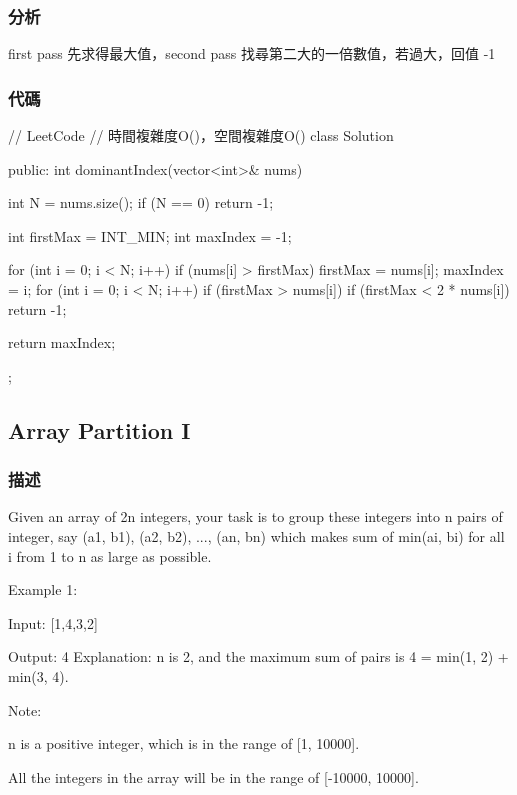 \subsubsection{分析}
first pass 先求得最大值，second pass 找尋第二大的一倍數值，若過大，回值 -1

\subsubsection{代碼}
\begin{Code}
// LeetCode
// 時間複雜度O()，空間複雜度O()
class Solution {
public:
    int dominantIndex(vector<int>& nums) {
        int N = nums.size();
        if (N == 0) return -1;

        int firstMax = INT_MIN;
        int maxIndex = -1;

        for (int i = 0; i < N; i++) {
            if (nums[i] > firstMax) {
                firstMax = nums[i];
                maxIndex = i;
            }
        }
        for (int i = 0; i < N; i++) {
            if (firstMax > nums[i])
                if (firstMax < 2 * nums[i]) return -1;
        }

        return maxIndex;
    }
};
\end{Code}

\subsection{Array Partition I}
\label{sec:array-partition-i}

\subsubsection{描述}
Given an array of 2n integers, your task is to group these integers into n pairs of integer, say (a1, b1), (a2, b2), ..., (an, bn) which makes sum of min(ai, bi) for all i from 1 to n as large as possible.

Example 1:
\begin{Code}
Input: [1,4,3,2]

Output: 4
Explanation: n is 2, and the maximum sum of pairs is 4 = min(1, 2) + min(3, 4).
\end{Code}

Note:
\begindot
\item n is a positive integer, which is in the range of [1, 10000].
\item All the integers in the array will be in the range of [-10000, 10000].
\myenddot


